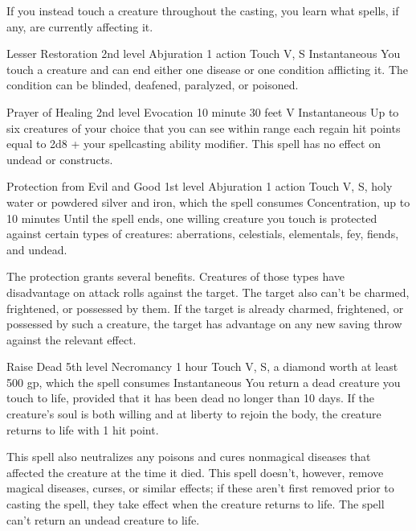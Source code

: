\documentclass[10pt,a4paper,twoside,bg=print,twocolumn,openany,nodeprecatedcode]{dndbook}
\begin{document}
If you instead touch a creature throughout the casting, you learn what spells, if any, are currently affecting it.



\DndSpellHeader%
{Lesser Restoration}
{2nd level Abjuration}
{1 action}
{Touch}
{V, S}
{Instantaneous}
You touch a creature and can end either one disease or one condition afflicting it. The condition can be blinded, deafened, paralyzed, or poisoned.



\DndSpellHeader%
{Prayer of Healing}
{2nd level Evocation}
{10 minute}
{30 feet}
{V}
{Instantaneous}
Up to six creatures of your choice that you can see within range each regain hit points equal to 2d8 + your spellcasting ability modifier. This spell has no effect on undead or constructs.



\DndSpellHeader%
{Protection from Evil and Good}
{1st level Abjuration}
{1 action}
{Touch}
{V, S, holy water or powdered silver and iron, which the spell consumes}
{Concentration, up to 10 minutes}
Until the spell ends, one willing creature you touch is protected against certain types of creatures: aberrations, celestials, elementals, fey, fiends, and undead.

The protection grants several benefits. Creatures of those types have disadvantage on attack rolls against the target. The target also can't be charmed, frightened, or possessed by them. If the target is already charmed, frightened, or possessed by such a creature, the target has advantage on any new saving throw against the relevant effect.



\DndSpellHeader%
{Raise Dead}
{5th level Necromancy}
{1 hour}
{Touch}
{V, S, a diamond worth at least 500 gp, which the spell consumes}
{Instantaneous}
You return a dead creature you touch to life, provided that it has been dead no longer than 10 days. If the creature's soul is both willing and at liberty to rejoin the body, the creature returns to life with 1 hit point.

This spell also neutralizes any poisons and cures nonmagical diseases that affected the creature at the time it died. This spell doesn't, however, remove magical diseases, curses, or similar effects; if these aren't first removed prior to casting the spell, they take effect when the creature returns to life. The spell can't return an undead creature to life.
\end{document}
